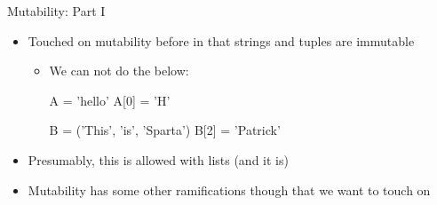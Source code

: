 \documentclass[pdf, aspectratio=169, 12pt]{beamer}
\begin{document}

\begin{frame}[fragile]{Mutability: Part I}
	\begin{itemize}
		\item<1-> Touched on mutability before in that strings and tuples are immutable
			\begin{itemize}
				\item We can \alert{not} do the below:
					\begin{pythoncode}
						A = 'hello'
						A[0] = 'H'

						B = ('This', 'is', 'Sparta')
						B[2] = 'Patrick'
					\end{pythoncode}
			\end{itemize}
		\item<2-> Presumably, this is allowed with lists (and it is)
		\item<2-> Mutability has some other ramifications though that we want to touch on
	\end{itemize}
\end{frame}
\end{document}
